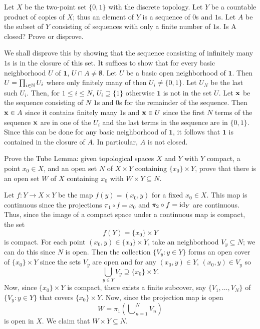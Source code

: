 \begin{problem}
  Let \(X\) be the two-point set \(\{0,1\}\) with the discrete
  topology. Let \(Y\) be a countable product of copies of \(X\); thus an
  element of \(Y\) is a sequence of \(0\)s and \(1\)s.  Let \(A\) be the
  subset of \(Y\) consisting of sequences with only a finite number of
  \(1\)s. Is A closed?  Prove or disprove.
\end{problem}
\begin{solution}
  We shall disprove this by showing that the sequence consisting of
  infinitely many \(1\)s is in the closure of this set. It suffices to show
  that for every basic neighborhood \(U\) of \(\mathbf{1}\),
  \(U\cap A\neq\emptyset\). Let \(U\) be a basic open neighborhood of
  \(\mathbf{1}\). Then \(U=\prod_{i\in\mathbb{N}} U_i\) where only finitely many
  of then \(U_i\neq \{0,1\}\). Let \(U_N\) be the last such \(U_i\). Then,
  for \(1\leq i\leq N\), \(U_i\supseteq\{1\}\) otherwise \(\mathbf{1}\) is
  not in the set \(U\). Let \(\mathbf{x}\) be the sequence consisting of \(N\)
  \(1\)s and \(0\)s for the remainder of the sequence. Then \(\mathbf{x}\in A\)
  since it contains finitely many \(1\)s and \(\mathbf{x}\in U\) since the first
  \(N\) terms of the sequence \(\mathbf{x}\) are in one of the \(U_i\) and the
  last terms in the sequence are in \(\{0,1\}\). Since this can be done for
  any basic neighborhood of \(\mathbf{1}\), it follows that \(\mathbf{1}\)
  is contained in the closure of \(A\). In particular, \(A\) is not
  closed.
\end{solution}

\begin{problem}
  Prove the Tube Lemma: given topological spaces \(X\) and \(Y\) with \(Y\)
  compact, a point \(x_0\in X\), and an open set \(N\) of \(X\times Y\)
  containing \(\{x_0\}\times Y\), prove that there is an open set \(W\) of
  \(X\) containing \(x_0\) with \(W\times Y\subseteq N\).
\end{problem}
\begin{solution}
  Let \(f\colon Y\to X\times Y\) be the map \(f(y)=(x_0,y)\) for a fixed
  \(x_0\in X\). This map is continuous since the projections
  \(\pi_1\circ f=x_0\) and \(\pi_2\circ f=\operatorname{id}_Y\) are continuous. Thus,
  since the image of a compact space under a continuous map is compact, the
  set
  \[
    f(Y)=\{x_0\}\times Y
  \]
  is compact. For each point \((x_0,y)\in \{x_0\}\times Y\), take an
  neighborhood \(V_y\subseteq N\); we can do this since \(N\) is open. Then
  the collection \(\{V_y:y\in Y\}\) forms an open cover of
  \(\{x_0\}\times Y\) since the sets \(V_y\) are open and for any
  \((x_0,y)\in Y\), \((x_0,y)\in V_y\) so
  \[
    \bigcup_{y\in Y}V_y\supseteq \{x_0\}\times Y.
  \]
  Now, since \(\{x_0\}\times Y\) is compact, there exists a finite
  subcover, say \(\{V_1,\dotsc,V_N\}\) of \(\{V_y:y\in Y\}\) that covers
  \(\{x_0\}\times Y\). Now, since the projection map is open
  \[
    W=\pi_1\left(\bigcup\nolimits_{n=1}^NV_n\right)
  \]
  is open in \(X\). We claim that \(W\times Y\subseteq N\).
\end{solution}

